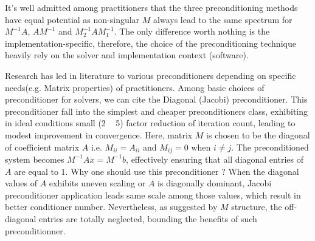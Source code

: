 It's well admitted among practitioners that the three preconditioning methods have equal potential as non-singular $M$ always lead to the same spectrum for $M^{-1}A$, $AM^{-1}$ and $M_{2}^{-1}AM_{1}^{-1}$. The only difference worth nothing is the implementation-specific, therefore, the choice of the preconditioning technique heavily rely on the solver and implementation context (software).

Research has led in literature to various preconditioners depending on specific needs(e.g. Matrix properties) of practitioners. Among basic choices of preconditioner for solvers, we can cite the Diagonal (Jacobi) preconditioner. This preconditioner fall into the simplest and cheaper preconditioners class, exhibiting in ideal conditions small (2 ~ 5) factor reduction of iteration count, leading to modest improvement in convergence. Here, matrix $M$ is chosen to be the diagonal of coefficient matrix $A$ i.e. $M_{ii} = A_{ii}$ and $M_{ij}=0$ when $i \neq j$. The preconditioned system becomes $M^{-1}Ax = M^{-1}b$, effectively ensuring that all diagonal entries of $A$ are equal to $1$. Why one should use this preconditioner ? When the diagonal values of $A$ exhibits uneven scaling or $A$ is diagonally dominant, Jacobi preconditioner application leads same scale among those values, which result in better conditioner number. Nevertheless, as suggested by $M$ structure, the off-diagonal entries are totally neglected, bounding the benefits of such preconditionner.

